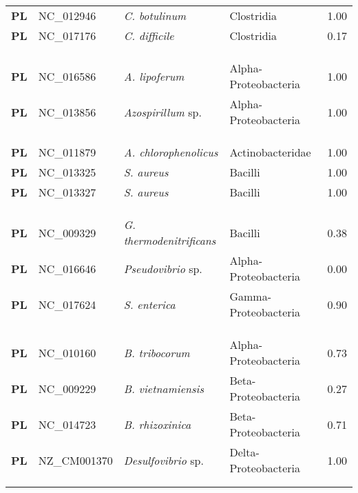 \begin{adjustwidth}{-3cm}{2cm}
{\begin{supertabular}{>{\bfseries}l|p{0.1\textwidth}p{0.14\textwidth}l|l}
PL & NC\_012946 & \textit{C. botulinum} & Clostridia & 1.00\\
PL & NC\_017176 & \textit{C. difficile} & Clostridia & 0.17\\
\\
\\
\hline\\
PL & NC\_016586 & \textit{A. lipoferum} & Alpha-Proteobacteria & 1.00\\
PL & NC\_013856 & \textit{Azospirillum} sp. & Alpha-Proteobacteria & 1.00\\
\\
\\
\hline\\
PL & NC\_011879 & \textit{A. chlorophenolicus} & Actinobacteridae & 1.00\\
PL & NC\_013325 & \textit{S. aureus} & Bacilli & 1.00\\
PL & NC\_013327 & \textit{S. aureus} & Bacilli & 1.00\\
\\
\\
\hline\\
PL & NC\_009329 & \textit{G. thermodenitrificans} & Bacilli & 0.38\\
PL & NC\_016646 & \textit{Pseudovibrio} sp. & Alpha-Proteobacteria & 0.00\\
PL & NC\_017624 & \textit{S. enterica} & Gamma-Proteobacteria & 0.90\\
\\
\\
\hline\\
PL & NC\_010160 & \textit{B. tribocorum} & Alpha-Proteobacteria & 0.73\\
PL & NC\_009229 & \textit{B. vietnamiensis} & Beta-Proteobacteria & 0.27\\
PL & NC\_014723 & \textit{B. rhizoxinica} & Beta-Proteobacteria & 0.71\\
PL & NZ\_CM001370 & \textit{Desulfovibrio} sp. & Delta-Proteobacteria & 1.00\\
\\
\\

\end{supertabular}}
\end{adjustwidth}
